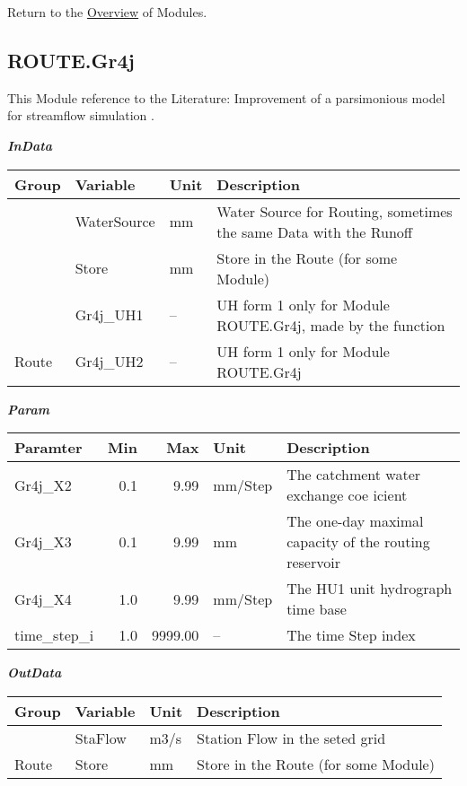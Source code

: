 \documentclass[
]{book}
\begin{document}
Return to the \protect\hyperlink{module}{Overview} of Modules.

\hypertarget{ROUTE.Gr4j}{%
\subsection{ROUTE.Gr4j}\label{ROUTE.Gr4j}}

This Module reference to the Literature: Improvement of a parsimonious model for streamflow simulation \citep{Perrin.2003}.

\textbf{\emph{InData}}

\begin{table}[!h]
\centering
\begin{tabular}{l|l|l|l}
\hline
Group & Variable & Unit & Description\\
\hline
 & WaterSource & mm & Water Source for Routing, sometimes the same Data with the Runoff\\
\cline{2-4}
 & Store & mm & Store in the Route (for some Module)\\
\cline{2-4}
 & Gr4j\_UH1 & -- & UH form 1 only for Module ROUTE.Gr4j, made by the function\\
\cline{2-4}
\multirow{-4}{*}{\raggedright\arraybackslash Route} & Gr4j\_UH2 & -- & UH form 1 only for Module ROUTE.Gr4j\\
\hline
\end{tabular}
\end{table}

\textbf{\emph{Param}}

\begin{table}[!h]
\centering
\begin{tabular}{l|r|r|l|l}
\hline
Paramter & Min & Max & Unit & Description\\
\hline
Gr4j\_X2 & 0.1 & 9.99 & mm/Step & The catchment water exchange coe icient\\
\cline{1-5}
Gr4j\_X3 & 0.1 & 9.99 & mm & The one-day maximal capacity of the routing reservoir\\
\cline{1-5}
Gr4j\_X4 & 1.0 & 9.99 & mm/Step & The HU1 unit hydrograph time base\\
\cline{1-5}
time\_step\_i & 1.0 & 9999.00 & -- & The time Step index\\
\hline
\end{tabular}
\end{table}

\textbf{\emph{OutData}}

\begin{table}[!h]
\centering
\begin{tabular}{l|l|l|l}
\hline
Group & Variable & Unit & Description\\
\hline
 & StaFlow & m3/s & Station Flow in the seted grid\\
\cline{2-4}
\multirow{-2}{*}{\raggedright\arraybackslash Route} & Store & mm & Store in the Route (for some Module)\\
\hline
\end{tabular}
\end{table}
\end{document}
